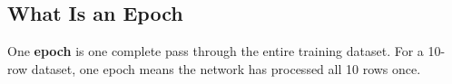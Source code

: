 \subsection{What Is an Epoch}

One \textbf{epoch} is one complete pass through the entire training dataset. For a
10-row dataset, one epoch means the network has processed all 10 rows once.

